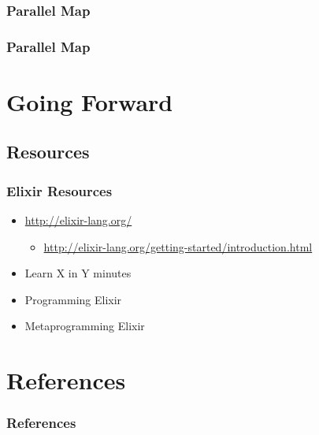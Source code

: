 \documentclass[english]{beamer}
\begin{document}
\begin{frame}[fragile]
\frametitle{Parallel Map}

\end{frame}

\begin{frame}[fragile]
\frametitle{Parallel Map}

\end{frame}

\section*{Going Forward}
\subsection*{Resources}
\begin{frame}
\frametitle{Elixir Resources}
\begin{itemize}
\item<2->{\url{http://elixir-lang.org/}}
\begin{itemize}
\item<2->{\url{http://elixir-lang.org/getting-started/introduction.html}}
\end{itemize}
\item<3->{Learn X in Y minutes~\cite{website:learnxiny}}
\item<4->{Programming Elixir~\cite{book:programming_elixir}}
\item<4->{Metaprogramming Elixir~\cite{book:metaprogramming_elixir}}
\end{itemize}
\end{frame}

\section*{References}
\begin{frame}[allowframebreaks]
\frametitle{References}
\nocite{*}
\renewcommand{\refname}{}


\end{frame}

\end{document}
